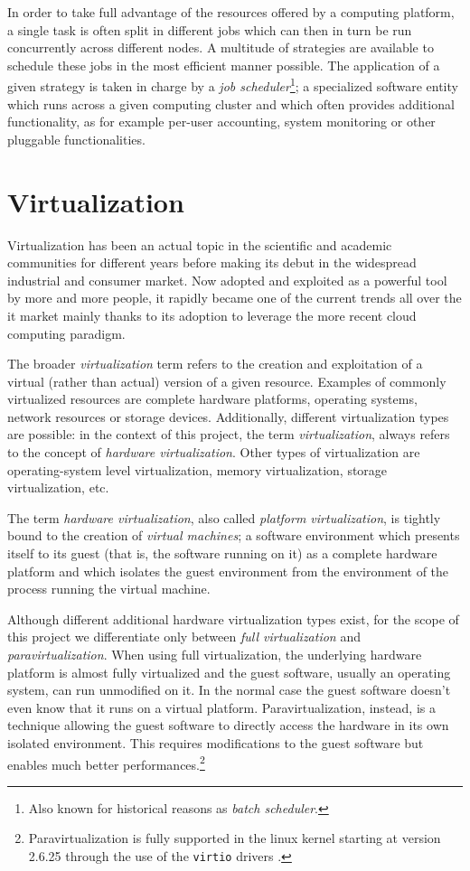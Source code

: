 In order to take full advantage of the resources offered by a computing platform, a single task is often split in different jobs which can then in turn be run concurrently across different nodes. A multitude of strategies are available to schedule these jobs in the most efficient manner possible. The application of a given strategy is taken in charge by a \emph{job scheduler}\footnote{Also known for historical reasons as \emph{batch scheduler}.}; a specialized software entity which runs across a given computing cluster and which often provides additional functionality, as for example per-user accounting, system monitoring or other pluggable functionalities.



\section{Virtualization}
\label{sec:virtualization}

Virtualization has been an actual topic in the scientific and academic communities for different years before making its debut in the widespread industrial and consumer market. Now adopted and exploited as a powerful tool by more and more people, it rapidly became one of the current trends all over the \gls{it} market mainly thanks to its adoption to leverage the more recent cloud computing paradigm.

The broader \emph{virtualization} term refers to the creation and exploitation of a virtual (rather than actual) version of a given resource. Examples of commonly virtualized resources are complete hardware platforms, operating systems, network resources or storage devices. Additionally, different virtualization types are possible: in the context of this project, the term \emph{virtualization}, always refers to the concept of \emph{hardware virtualization}. Other types of virtualization are operating-system level virtualization, memory virtualization, storage virtualization, etc.

The term \emph{hardware virtualization}, also called \emph{platform virtualization}, is tightly bound to the creation of \emph{virtual machines}; a software environment which presents itself to its guest (that is, the software running on it) as a complete hardware platform and which isolates the guest environment from the environment of the process running the virtual machine. 

Although different additional hardware virtualization types exist, for the scope of this project we differentiate only between \emph{full virtualization} and \emph{paravirtualization}. When using full virtualization, the underlying hardware platform is almost fully virtualized and the guest software, usually an operating system, can run unmodified on it. In the normal case the guest software doesn't even know that it runs on a virtual platform. Paravirtualization, instead, is a technique allowing the guest software to directly access the hardware in its own isolated environment. This requires modifications to the guest software but enables much better performances.\footnote{Paravirtualization is fully supported in the linux kernel starting at version 2.6.25 through the use of the \texttt{virtio} drivers \cite{virtio-www}.}

